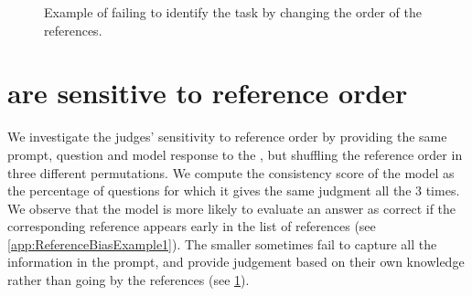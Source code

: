 \begin{figure}[H]
    \centering
    \caption{Example of  failing to identify the task by changing the order of the references.}
    \label{app:RefernceBiasExample2}
\end{figure}

\clearpage
\twocolumn
\section{\Judgemodels are sensitive to reference order}
\label{app:ref-bias-exp}

We investigate the judges' sensitivity to reference order by providing the same prompt, question and model response to the \judgemodels, but shuffling the reference order in three different permutations. We compute the consistency score of the model as the percentage of questions for which it gives the same judgment all the 3 times. 
%
We observe that the model is more likely to evaluate an answer as correct if the corresponding reference appears early in the list of references (see \cref{app:ReferenceBiasExample1}).
%
The smaller \judgemodels sometimes fail to capture all the information in the prompt, and provide judgement based on their own knowledge rather than going by the references (see  \cref{app:RefernceBiasExample2}).

